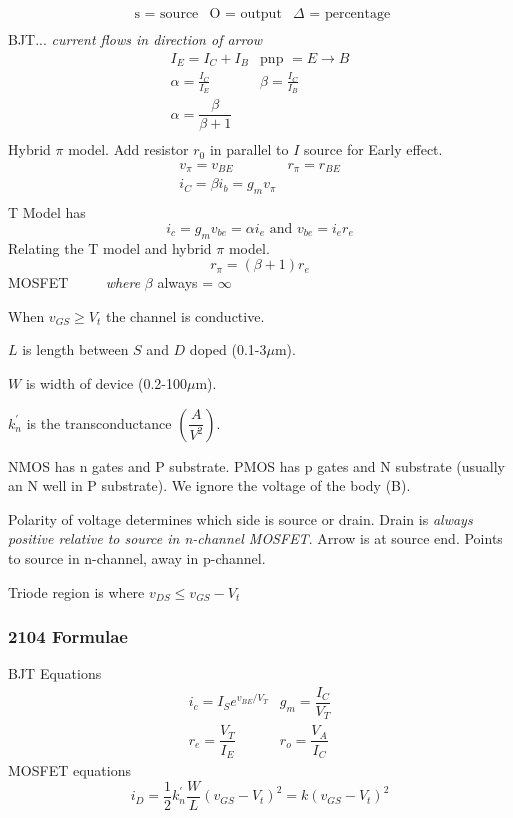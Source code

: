 \documentclass[a4paper,12pt]{article}
\begin{document}
\begin{multicols}{2}
\[\begin{array}{ccc}
\mbox{ s = source} & \mbox{O = output}&\Delta \mbox{ = percentage}\\
\end{array}
\]
\vfill
BJT... \emph{current flows in direction of arrow}
\[ 
\begin{array}{cc}
I_E = I_C + I_B&\mbox{pnp }=  E \rightarrow B\\
\alpha = \frac{I_C}{I_E}& \beta = \frac{I_C}{I_B}\\
\alpha = \dfrac{\beta}{\beta + 1}&\\
\end{array}
\]
\vfill
Hybrid $\pi$ model. Add resistor $r_0$ in parallel to $I$ source for Early effect.
\[ 
\begin{array}{cc}
v_\pi = v_{BE}&r_\pi = r_{BE}\\
i_{C} = \beta i_b = g_m v_\pi&\\
\end{array}
\]
T Model has 
\[i_c = g_m v_{be} = \alpha i_e \mbox{ and }v_{be} = i_e r_e\]
Relating the T model and hybrid $\pi$ model.
\[ r_\pi = (\beta + 1 )r_e\]
MOSFET \ \ \ \ \emph{ where} $\beta$ always = $\infty$
\medskip

When $v_{GS} \ge V_t$ the channel is conductive. 
\smallskip

$L$ is length between $S$ and $D$ doped (0.1-3$\mu$m). 
\smallskip

$W$ is width of device (0.2-100$\mu$m).
\smallskip

$k^\prime_n$ is the transconductance $\left(\dfrac{A}{V^2}\right)$.

NMOS has n gates and P substrate. PMOS has p gates and N substrate (usually an
N well in P substrate). We ignore the voltage of the body (B).

Polarity of voltage determines which side is source or drain. Drain is
\emph{always positive relative to source in n-channel MOSFET}. Arrow is at
source end. Points to source in n-channel, away in p-channel.

Triode region is where $v_{DS} \le v_{GS} - V_t$

\subsubsection*{2104 Formulae}
BJT Equations
\[
\begin{array}{cc}
i_c = I_S e^{v_{BE}/V_T}    & g_m = \dfrac{I_C}{V_T}\\
r_e = \dfrac{V_T}{I_E}       &r_o = \dfrac{V_A}{I_C}
\end{array}
\]
MOSFET equations
\[ i_D = \frac{1}{2} k_n^\prime \frac{W}{L}(v_{GS} - V_t)^2 = k(v_{GS} -
V_t)^2\]


\end{multicols}
\end{document}

